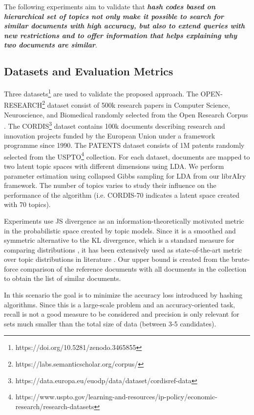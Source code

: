 The following experiments aim to validate that \textit{\textbf{hash codes based on hierarchical set of topics not only make it possible to search for similar documents with high accuracy, but also to extend queries with new restrictions and to offer information that helps explaining why two documents are similar}}.

\subsection{Datasets and Evaluation Metrics}
\label{sec:comparison-datasets}
Three datasets\footnote{https://doi.org/10.5281/zenodo.3465855} are used to validate the proposed approach. The OPEN-RESEARCH\footnote{https://labs.semanticscholar.org/corpus/} dataset consist of 500k research papers in Computer Science, Neuroscience, and Biomedical randomly selected from the Open Research Corpus \citep{Waleed2018}. The CORDIS\footnote{https://data.europa.eu/euodp/data/dataset/cordisref-data} dataset contains 100k documents describing research and innovation projects funded by the European Union under a framework programme since 1990. The PATENTS dataset consists of 1M patents randomly selected from the USPTO\footnote{https://www.uspto.gov/learning-and-resources/ip-policy/economic-research/research-datasets} collection. For each dataset, documents are mapped to two latent topic spaces with different dimensions using LDA. We perform parameter estimation using collapsed Gibbs sampling for LDA \citep{Griffiths2004b} from our librAIry  framework. The number of topics varies to study their influence on the performance of the algorithm (i.e. CORDIS-70 indicates a latent space created with 70 topics). 

Experiments use JS divergence as an information-theoretically motivated metric in the probabilistic space created by topic models. Since it is a smoothed and symmetric alternative to the KL divergence, which is a standard measure for comparing distributions \citep{Cha2007}, it has been extensively used as state-of-the-art metric over topic distributions in literature \citep{Towne2016, Aletras2017, Mao2017}. Our upper bound is created from the brute-force comparison of the reference documents with all documents in the collection to obtain the list of similar documents.  

In this scenario the goal is to minimize the accuracy loss introduced by hashing algorithms. Since this is a large-scale problem and an accuracy-oriented task, recall is not a good measure to be considered and precision is only relevant for sets much smaller than the total size of data (between 3-5 candidates).

